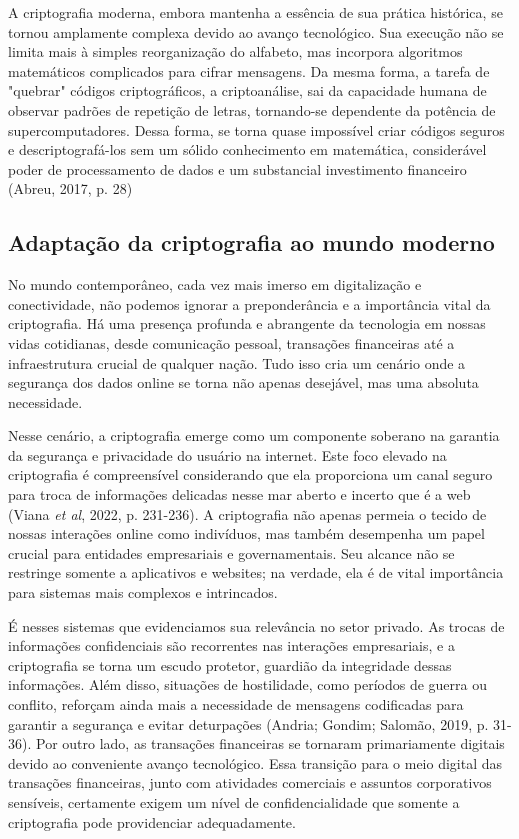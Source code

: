 A criptografia moderna, embora mantenha a essência de sua prática histórica, se
tornou amplamente complexa devido ao avanço tecnológico. Sua execução não se
limita mais à simples reorganização do alfabeto, mas incorpora algoritmos
matemáticos complicados para cifrar mensagens. Da mesma forma, a tarefa de
"quebrar" códigos criptográficos, a criptoanálise, sai da capacidade humana de
observar padrões de repetição de letras, tornando-se dependente da potência de
supercomputadores. Dessa forma, se torna quase impossível criar códigos seguros
e descriptografá-los sem um sólido conhecimento em matemática, considerável
poder de processamento de dados e um substancial investimento financeiro
(Abreu, 2017, p. 28)

\subsection{Adaptação da criptografia ao mundo moderno}

No mundo contemporâneo, cada vez mais imerso em digitalização e conectividade,
não podemos ignorar a preponderância e a importância vital da criptografia. Há
uma presença profunda e abrangente da tecnologia em nossas vidas cotidianas,
desde comunicação pessoal, transações financeiras até a infraestrutura crucial
de qualquer nação. Tudo isso cria um cenário onde a segurança dos dados online
se torna não apenas desejável, mas uma absoluta necessidade.

Nesse cenário, a criptografia emerge como um componente soberano na garantia da
segurança e privacidade do usuário na internet. Este foco elevado na
criptografia é compreensível considerando que ela proporciona um canal seguro
para troca de informações delicadas nesse mar aberto e incerto que é a web
(Viana \textit{et al}, 2022, p. 231-236). A criptografia não apenas permeia o
tecido de nossas interações online como indivíduos, mas também desempenha um
papel crucial para entidades empresariais e governamentais. Seu alcance não se
restringe somente a aplicativos e websites; na verdade, ela é de vital
importância para sistemas mais complexos e intrincados.

É nesses sistemas que evidenciamos sua relevância no setor privado. As trocas de
informações confidenciais são recorrentes nas interações empresariais, e a
criptografia se torna um escudo protetor, guardião da integridade dessas
informações. Além disso, situações de hostilidade, como períodos de guerra ou
conflito, reforçam ainda mais a necessidade de mensagens codificadas para garantir
a segurança e evitar deturpações (Andria; Gondim; Salomão, 2019, p. 31-36).
Por outro lado, as transações financeiras se tornaram primariamente digitais devido
ao conveniente avanço tecnológico. Essa transição para o meio digital das
transações financeiras, junto com atividades comerciais e assuntos corporativos
sensíveis, certamente exigem um nível de confidencialidade que somente a criptografia
pode providenciar adequadamente.

